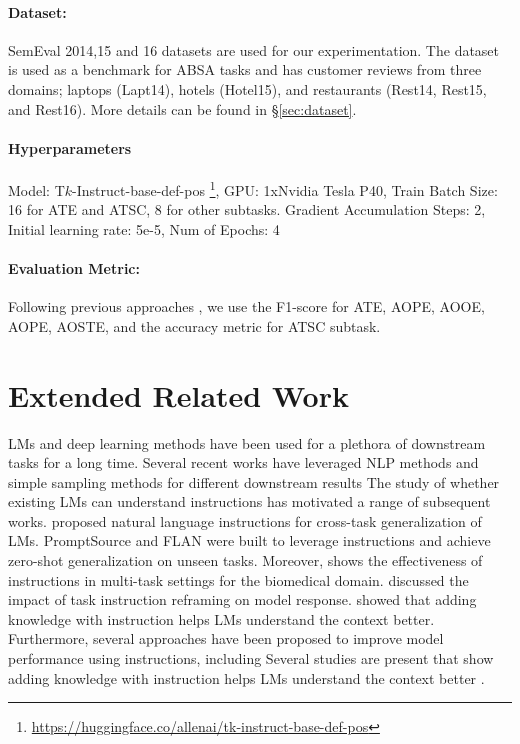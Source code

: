 \documentclass[11pt]{article}
\begin{document}
\paragraph{Dataset:} SemEval 2014,15 and 16 datasets are used for our experimentation. 
The dataset is used as a benchmark for ABSA tasks and has customer reviews from three domains; laptops (Lapt14), hotels (Hotel15), and restaurants (Rest14, Rest15, and Rest16).
More details can be found in \S \ref{sec:dataset}. 

\paragraph{Hyperparameters} 
Model: T$k$-Instruct-base-def-pos \footnote{\url{https://huggingface.co/allenai/tk-instruct-base-def-pos}},
GPU: 1xNvidia Tesla P40,
Train Batch Size: 16 for ATE and ATSC, 8 for other subtasks.
Gradient Accumulation Steps: 2,
Initial learning rate: 5e-5,
Num of Epochs: 4

\paragraph{Evaluation Metric:} Following previous approaches \cite{zhang-etal-2021-towards-generative, luo-etal-2020-grace}, we use the F1-score for ATE, AOPE, AOOE, AOPE, AOSTE, and the accuracy metric for ATSC subtask. 


\section{Extended Related Work}

LMs and deep learning methods have been used for a plethora of downstream tasks for a long time.
Several recent works have leveraged NLP methods and simple sampling methods for different downstream results 
The study of whether existing LMs can understand instructions has motivated a range of subsequent works. 
\citet{mishra-etal-2022-cross} proposed natural language instructions for cross-task generalization of LMs. 
PromptSource and FLAN \cite{wei2022finetuned} were built to leverage instructions and achieve zero-shot generalization on unseen tasks. 
Moreover, \citet{parmar-etal-2022-boxbart} shows the effectiveness of instructions in multi-task settings for the biomedical domain. 
\citet{mishra-etal-2022-reframing} discussed the impact of task instruction reframing on model response.
\citet{gupta2022john} showed that adding knowledge with instruction helps LMs understand the context better.
Furthermore, several approaches have been proposed to improve model performance using instructions, including \cite{wang-etal-2022-super, luo2022biotabqa, mishra2022help} 
Several studies are present that show adding knowledge with instruction helps LMs understand the context better \cite{gupta2021context}. 
\end{document}
